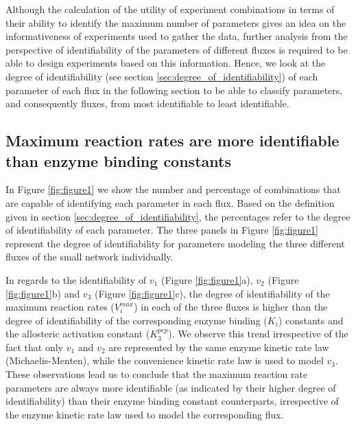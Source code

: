 \documentclass[10pt]{article}
\begin{document}
	Although the calculation of the utility of experiment combinations in terms of their ability to identify the maximum number of parameters gives an idea on the informativeness of experiments used to gather the data, further analysis from the perspective of identifiability of the parameters of different fluxes is required to be able to design experiments based on this information. Hence, we look at the degree of identifiability (see section \ref{sec:degree_of_identifiability}) of each parameter of each flux in the following section to be able to classify parameters, and consequently fluxes, from most identifiable to least identifiable.
	
	\subsection{Maximum reaction rates are more identifiable than enzyme binding constants}\label{sec:trends}	
	In Figure \ref{fig:figure1} we show the number and percentage of combinations that are capable of identifying each parameter in each flux. Based on the definition given in section \ref{sec:degree_of_identifiability}, the percentages refer to the degree of identifiability of each parameter. The three panels in Figure \ref{fig:figure1} represent the degree of identifiability for parameters modeling the three different fluxes of the small network individually. 
	
	In regards to the identifiability of $v_1$ (Figure \ref{fig:figure1}a), $v_2$ (Figure \ref{fig:figure1}b) and $v_3$ (Figure \ref{fig:figure1}c), the degree of identifiability of the maximum reaction rates ($V_i^{max}$) in each of the three fluxes is higher than the degree of identifiability of the corresponding enzyme binding ($K_i$) constants and the allosteric activation constant ($K_3^{pep}$). We observe this trend irrespective of the fact that only  $v_1$ and $v_2$ are represented by the same enzyme kinetic rate law (Michaelis-Menten), while the convenience kinetic rate law is used to model $v_3$. These observations lead us to conclude that the maximum reaction rate parameters are always more identifiable (as indicated by their higher degree of identifiability) than their enzyme binding constant counterparts, irrespective of the enzyme kinetic rate law used to model the corresponding flux.
	
\end{document}
